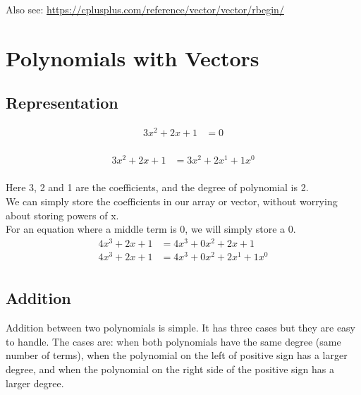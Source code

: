 \documentclass[12pt]{article}
\begin{document}
\vspace{1cm}

\noindent Also see: \url{https://cplusplus.com/reference/vector/vector/rbegin/}


\newpage
{}
\section*{Polynomials with Vectors}

\subsection*{Representation}

\begin{align*}
    3x^2 + 2x + 1 &= 0 \\ 
\end{align*}

\begin{align*}
    3x^2 + 2x + 1 &= 3x^2 + 2x^1 + 1x^0 \\ 
\end{align*}

\noindent Here 3, 2 and 1 are the coefficients, and the degree of polynomial is 2. \\

\noindent We can simply store the coefficients in our array or vector, without  worrying about storing powers of x. \\

\noindent For an equation where a middle term is $0$, we will simply store a $0$. \\

\begin{align*}
    4x^3 + 2x + 1 &= 4x^3 + 0x^2 + 2x + 1 \\ 
    4x^3 + 2x + 1 &= 4x^3 + 0x^2 + 2x^1 + 1x^0 \\ 
\end{align*}











{}
\subsection*{Addition}

\noindent Addition between two polynomials is simple. It has three cases but they are easy to handle. The cases are: 
when both polynomials have the same degree (same number of terms), when the polynomial on the left of positive sign 
has a larger degree, and when the polynomial on the right side of the positive sign has a larger degree. \\
\end{document}
